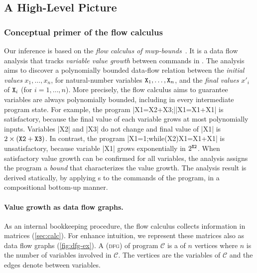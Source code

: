 \subsection{A High-Level Picture}
\label{sec:prelim}

\subsubsection{Conceptual primer of the flow calculus}
\label{subsec:flow-calc-intro}

Our  inference is based on the \emph{flow calculus of
mwp-bounds}~\cite{jones2009,aubert20222}. It is a data flow
analysis that tracks \emph{variable value growth} between commands in
. The analysis aims to discover a polynomially bounded
data-flow relation between the \emph{initial values}
\(x_1,\ldots,x_n\), for natural-number variables
\(\prm{X}_1,\ldots,\prm{X}_n\), and the \emph{final values}
\(x'_i\) of \(\prm{X}_i\) (for \(i=1,\ldots,n\)). More precisely,
the flow calculus aims to guarantee variables are always polynomially bounded,
including in every intermediate program state. For example, the program
\pr|X1=X2+X3;|\pr|X1=X1+X1| is satisfactory, because the final value of each
variable grows at most polynomially \wrt inputs. Variables \pr|X2| and \pr|X3|
do not change and final value of \pr|X1| is \(2 \times (\prm{X2} + \prm{X3})\).
In contrast, the program \pr|X1=1;while(X2){X1=X1+X1}| is unsatisfactory,
because variable \pr|X1| grows exponentially in \(2^{\prm{X2}}\). When
satisfactory value growth can be confirmed for all variables, the analysis
assigns the program a \emph{bound} that characterizes the value growth. The
analysis result is derived statically, by applying s to the
commands of the program, in a compositional bottom-up
manner.

\paragraph*{Value growth as data flow graphs.}
As an internal bookkeeping procedure, the flow calculus collects information in
matrices (\autoref{sec:calc}). For enhance intuition, we represent these
matrices also as data flow graphs (\autoref{fig:dfg-ex}). A \emph{} (\textsc{dfg}) of program \(\mathcal{C}\) is a
 of \(n\) vertices where \(n\) is the number of variables
involved in \(\mathcal{C}\). The vertices are the variables of
\(\mathcal{C}\) and the edges denote  between
variables.

